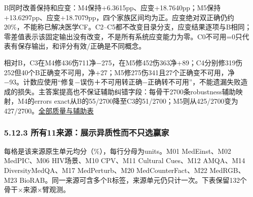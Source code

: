 \documentclass[
  11pt,
  a4paper,
]{article}
\begin{document}
B同时改善保持和应变：M4保持+6.3615pp、应变+18.7640pp；M5保持+13.6297pp、应变+18.7079pp，四个家族区间均为正。应变绝对双正确仍约20\%，不能称已解决医学CF。C2--C5都不改变目录分支，应变结果逐项与B相同；零差值表示该固定输出没有改变，不是所有系统应变能力为零。C0不可用=0只代表有保存输出，和评分有效/正确是不同概念。

相对B，C3在M4修436伤711净−275，在M5修452伤363净+89；C4分别修319伤252但40个B正确变不可用，净+27；M5修275伤341且27个正确变不可用，净−93。计数应使用``修复−误伤＋不可用转正确−正确转不可用''，不能遗漏失败造成的损失。主答案提高也不保证辅助纠错字段：每骨干2700条robustness辅助映射，M4的errors
exact从B的55/2700降至C3的51/2700；M5则从425/2700变为427/2700。\href{https://github.com/xiotakut/cf_mrg/blob/main/papers/2026-10-02_cf_moa/author_dossier/records/research/cf_moa_experiment_report.md\#L1876}{全部质量与辅助表}

\subsubsection{5.12.3
所有11来源：展示异质性而不只选赢家}\label{ux6240ux670911ux6765ux6e90ux5c55ux793aux5f02ux8d28ux6027ux800cux4e0dux53eaux9009ux8d62ux5bb6}

每格是该来源原生单元均分（\%），每行分母为units。M01 MedEinst、M02
MedPIC、M06 HIV场景、M10 CPV、M11 Cultural Cues、M12 AMQA、M14
DiversityMedQA、M17 MedPerturb、M20 MedCounterFact、M22 MedRGB、M23
BioRAB。同一来源可含多个R标签，来源单元仍只计一次。下表保留132个骨干×来源×臂观测。
\end{document}
